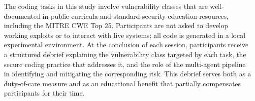 The coding tasks in this study involve vulnerability classes that are well-documented in public curricula and standard security education resources, including the MITRE CWE Top 25. Participants are not asked to develop working exploits or to interact with live systems; all code is generated in a local experimental environment. At the conclusion of each session, participants receive a structured debrief explaining the vulnerability class targeted by each task, the secure coding practice that addresses it, and the role of the multi-agent pipeline in identifying and mitigating the corresponding risk. This debrief serves both as a duty-of-care measure and as an educational benefit that partially compensates participants for their time.

